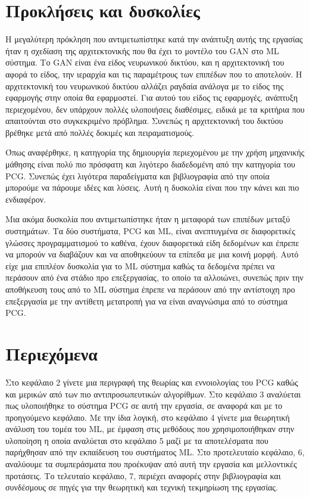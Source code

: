 \section{Προκλήσεις και δυσκολίες}
\par
Η μεγαλύτερη πρόκληση που αντιμετωπίστηκε κατά την ανάπτυξη αυτής της εργασίας ήταν η σχεδίαση της αρχιτεκτονικής που θα έχει το μοντέλο του GAN στο ML σύστημα. Το GAN είναι ένα είδος νευρωνικού δικτύου, και η αρχιτεκτονική του αφορά το είδος, την ιεραρχία και τις παραμέτρους των επιπέδων που το αποτελούν. Η αρχιτεκτονική του νευρωνικού δικτύου αλλάζει ραγδαία ανάλογα με το είδος της εφαρμογής στην οποία θα εφαρμοστεί. Για αυτού του είδος τις εφαρμογές, ανάπτυξη περιεχομένου, δεν υπάρχουν πολλές υλοποιήσεις διαθέσιμες, ειδικά με τα κριτήρια που απαιτούνται στο συγκεκριμένο πρόβλημα. Συνεπώς η αρχιτεκτονική του δικτύου βρέθηκε μετά από πολλές δοκιμές και πειραματισμούς.
\par
Όπως αναφέρθηκε, η κατηγορία της δημιουργία περιεχομένου με την χρήση μηχανικής μάθησης είναι πολύ πιο πρόσφατη και λιγότερο διαδεδομένη από την κατηγορία του PCG. Συνεπώς έχει λιγότερα παραδείγματα και βιβλιογραφία από την οποία μπορούμε να πάρουμε ιδέες και λύσεις. Αυτή η δυσκολία είναι που την κάνει και πιο ενδιαφέρον.
\par
Μια ακόμα δυσκολία που αντιμετωπίστηκε ήταν η μεταφορά των επιπέδων μεταξύ συστημάτων. Τα δύο συστήματα, PCG και ML, είναι ανεπτυγμένα σε διαφορετικές γλώσσες προγραμματισμού το καθένα, έχουν διαφορετικά είδη δεδομένων και έπρεπε να μπορούν να διαβάζουν και να αποθηκεύουν τα επίπεδα με μια κοινή μορφή. Αυτό είχε μια επιπλέον δυσκολία για το ML σύστημα καθώς τα δεδομένα πρέπει να περάσουν από ένα στάδιο προ επεξεργασίας, το οποίο τα αλλοιώνει, συνεπώς πριν την αποθήκευση τους από το ML σύστημα έπρεπε να περάσουν από την αντίστοιχη προ επεξεργασία με την αντίθετη μετατροπή για να είναι αναγνώσιμα από το σύστημα PCG.


\section{Περιεχόμενα}
Στο κεφάλαιο 2 γίνετε μια περιγραφή της θεωρίας και εννοιολογίας του PCG καθώς και μερικών από των πιο αντιπροσωπευτικών αλγορίθμων. Στο κεφάλαιο 3 αναλύεται πως υλοποιήθηκε το σύστημα PCG σε αυτή την εργασία, σε αναφορά και με το προηγούμενο κεφάλαιο. Με την ίδια λογική, στο κεφάλαιο 4 γίνετε μια θεωρητική ανάλυση του τομέα του ML, με έμφαση στις μεθόδους που χρησιμοποιήθηκαν στην υλοποίηση η οποία αναλύεται στο κεφάλαιο 5 μαζί με τα αποτελέσματα που παρήχθησαν από την εκπαίδευση του συστήματος ML. Στο προτελευταίο κεφάλαιο, 6, αναλύουμε τα συμπεράσματα που προέκυψαν από αυτή την εργασία και μελλοντικές προτάσεις. Το τελευταίο κεφάλαιο, 7, περιέχει αναφορές στην βιβλιογραφία και συνδέσμους σε πηγές για την θεωρητική και τεχνική τεκμηρίωση της εργασίας.




